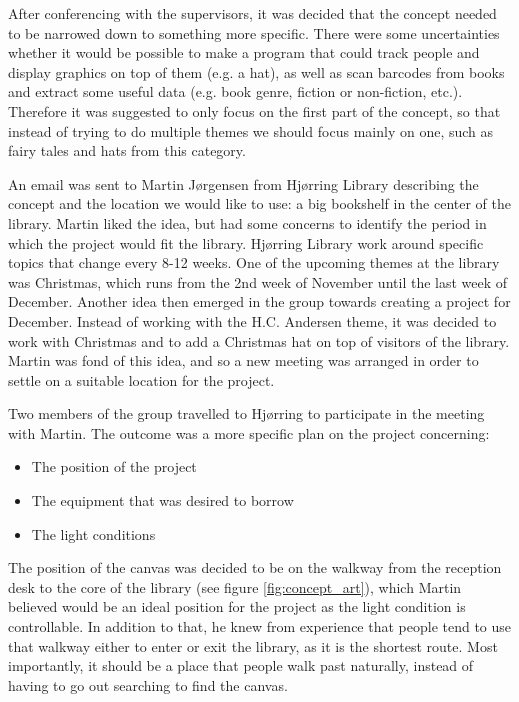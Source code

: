 After conferencing with the supervisors, it was decided that the concept needed to be narrowed down to something more specific. There were some uncertainties whether it would be possible to make a program that could track people and display graphics on top of them (e.g. a hat), as well as scan barcodes from books and extract some useful data (e.g. book genre, fiction or non-fiction, etc.). Therefore it was suggested to only focus on the first part of the concept, so that instead of trying to do multiple themes we should focus mainly on one, such as fairy tales and hats from this category.


An email was sent to Martin J{\o}rgensen from Hj{\o}rring Library describing the concept and the location we would like to use: a big bookshelf in the center of the library. Martin liked the idea, but had some concerns to identify the period in which the project would fit the library. Hj{\o}rring Library work around specific topics that change every 8-12 weeks. One of the upcoming themes at the library was Christmas, which runs from the 2nd week of November until the last week of December. Another idea then emerged in the group towards creating a project for December. Instead of working with the H.C. Andersen theme, it was decided to work with Christmas and to add a Christmas hat on top of visitors of the library. Martin was fond of this idea, and so a new meeting was arranged in order to settle on a suitable location for the project.

Two members of the group travelled to Hj{\o}rring to participate in the meeting with Martin. The outcome was a more specific plan on the project concerning:

\begin{itemize}
\item The position of the project
\item The equipment that was desired to borrow
\item The light conditions
\end{itemize}

The position of the canvas was decided to be on the walkway from the reception desk to the core of the library (see figure \ref{fig:concept_art}), which Martin believed would be an ideal position for the project as the light condition is controllable. In addition to that, he knew from experience that people tend to use that walkway either to enter or exit the library, as it is the shortest route. Most importantly, it should be a place that people walk past naturally, instead of having to go out searching to find the canvas.

